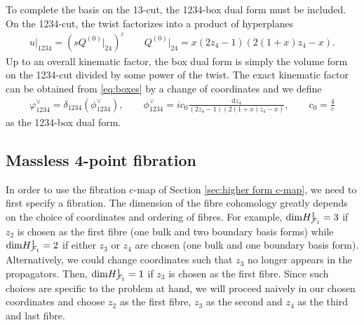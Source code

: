 \documentclass[11pt]{article}
\renewcommand{\d}{\text{d}}
\newcommand{\F}{\mathcal{F}}
\newcommand{\vphi}{\varphi}
\newcommand{\vep}{\varepsilon}
\begin{document}
To complete the basis on the 13-cut, the 1234-box dual form must be included. On the 1234-cut, the twist factorizes into a product of hyperplanes
\begin{align}
	u\vert_{1234} = \left( s Q^{(0)} \vert_{24} \right)^\vep
	\qquad 
	Q^{(0)} \vert_{24} =  x (2z_4-1) (2(1+x)z_4-x).
\end{align}
Up to an overall kinematic factor, the box dual form is simply the volume form on the 1234-cut divided by some power of the twist. The exact kinematic factor can be obtained from \eqref{eq:boxes} by a change of coordinates and we define
\begin{align} \label{eq:boxdual}
	\vphi^\vee_{1234} = \delta_{1234}(\phi^\vee_{1234}),
	\qquad 
	\phi^\vee_{1234} 
		= ic_0 \frac{\d z_4}{(2z_4-1) (2(1+x)z_4-x)},
	\qquad
	c_0 = \frac{4}{\vep} 
\end{align}
as the 1234-box dual form. 


\subsection{Massless 4-point fibration \label{sec:4propfib}}

In order to use the fibration c-map of Section \ref{sec:higher form c-map}, we need to first specify a fibration. The dimension of the fibre cohomology greatly depends on the choice of coordinates and ordering of fibres. For example, ${\rm dim}H_{\F_1}^1=3$ if $z_2$ is chosen as the first fibre (one bulk and two boundary basis forms) while ${\rm dim}H_{\F_1}^1=2$ if either $z_3$ or $z_4$ are chosen (one bulk and one boundary basis form). Alternatively, we could change coordinates such that $z_3$ no longer appears in the propagators. Then, ${\rm dim}H_{\F_1}^1=1$ if $z_3$ is chosen as the first fibre. Since such choices are specific to the problem at hand, we will proceed naively in our chosen coordinates and choose $z_2$ as the first fibre, $z_3$ as the second and $z_4$ as the third and last fibre. 


\end{document}
